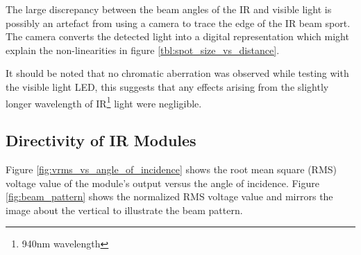 The large discrepancy between the beam angles of the IR and visible light is possibly an artefact from using a camera to trace the edge of the IR beam sport. The camera converts the detected light into a digital representation which might explain the non-linearities in figure \ref{tbl:spot_size_vs_distance}.

It should be noted that no chromatic aberration was observed while testing with the visible light LED, this suggests that any effects arising from the slightly longer wavelength of IR\footnote{940nm wavelength} light were negligible.






\subsection{Directivity of IR Modules}

Figure \ref{fig:vrms_vs_angle_of_incidence} shows the root mean square (RMS) voltage value of the module's output versus the angle of incidence. Figure \ref{fig:beam_pattern} shows the normalized RMS voltage value and mirrors the image about the vertical to illustrate the beam pattern.


